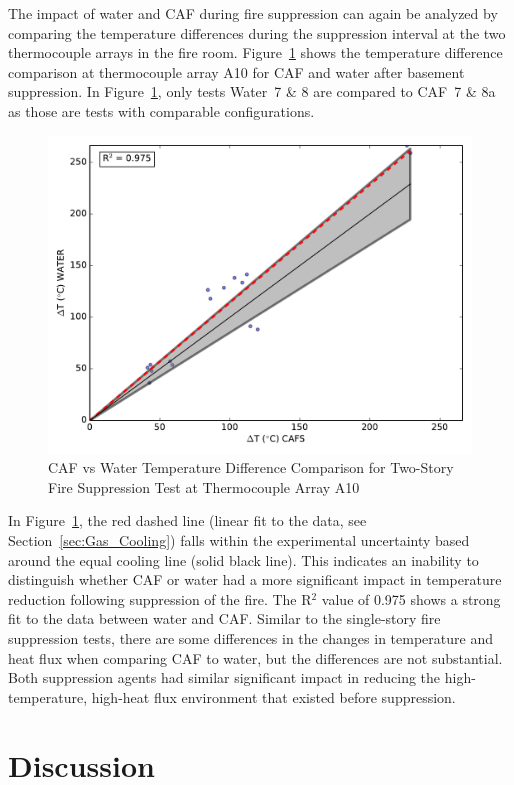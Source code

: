 \documentclass[12pt,oneside]{book}
\begin{document}
The impact of water and CAF during fire suppression can  again be analyzed by comparing the temperature differences during the suppression interval at the two thermocouple arrays in the fire room. Figure~\ref{fig:fs_a10} shows the temperature difference comparison at thermocouple array A10 for CAF and water after basement suppression. In Figure~\ref{fig:fs_a10}, only tests Water~7 \& 8 are compared to CAF~7 \& 8a as those are tests with comparable configurations.

\begin{figure}[!ht]
	\includegraphics[width=.7\columnwidth]{../Figures/Script_Figures/TC_A10_scatter}
	\caption{CAF vs Water Temperature Difference Comparison for Two-Story Fire Suppression Test at Thermocouple Array A10}
	\label{fig:fs_a10}
\end{figure}

In Figure~\ref{fig:fs_a10}, the red dashed line (linear fit to the data, see Section~\ref{sec:Gas_Cooling}) falls within the experimental uncertainty based around the equal cooling line (solid black line). This indicates an inability to distinguish whether CAF or water had a more significant impact in temperature reduction following suppression of the fire. The R$^2$ value of 0.975 shows a strong fit to the data between water and CAF. Similar to the single-story fire suppression tests, there are some differences in the changes in temperature and heat flux when comparing CAF to water, but the differences are not substantial. Both suppression agents had similar significant impact in reducing the high-temperature, high-heat flux environment that existed before suppression. 

\chapter{Discussion}
\label{chap:Discussion}
\end{document}
